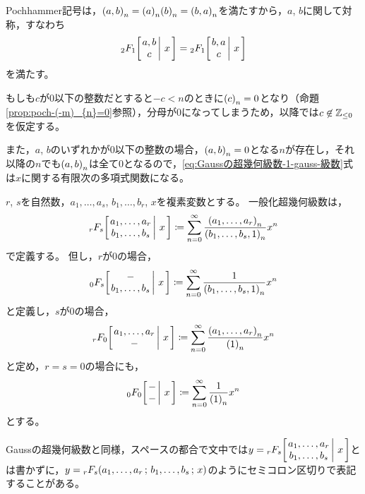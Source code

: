 \documentclass[a4paper,draft]{ltjsarticle}
\begin{document}
\begin{rem}\label{rem:gauss-対称性}
    Pochhammer記号は，$\poch{a,b}{n}=\poch{a}{n}\poch{b}{n}=\poch{b,a}{n}$を満たすから，$a$, $b$に関して対称，すなわち
    \begin{equation}
        \Gauss{a}{b}{c}{x}=\Gauss{b}{a}{c}{x}
    \end{equation}
    を満たす。
\end{rem}

もしも$c$が$0$以下の整数だとすると$-c < n$のときに$\poch{c}{n}=0$となり（命題\ref{prop:poch-(-m)_{n}=0}参照），分母が$0$になってしまうため，以降では$c\not\in\mathbb{Z}_{\leq 0}$を仮定する。

また，$a$, $b$のいずれかが$0$以下の整数の場合，$\poch{a,b}{n}=0$となる$n$が存在し，それ以降の$n$でも$\poch{a,b}{n}$は全て$0$となるので，\eqref{eq:Gaussの超幾何級数-1-gauss-級数}式は$x$に関する有限次の多項式関数になる。

\begin{defi}[一般化超幾何級数]
    $r$, $s$を自然数，$a_1,\dots,a_s$, $b_1,\dots,b_r$, $x$を複素変数とする。
    一般化超幾何級数は，
    \begin{equation}
        \pfq{r}{s}{a_1,\dots,a_r}{b_1,\dots,b_s}{x}\coloneqq \sum_{n=0}^\infty \dfrac{\poch{a_1,\dots,a_r}{n}}{\poch{b_1,\dots,b_s,1}{n}}x^n
    \end{equation}
    で定義する。
    但し，$r$が$0$の場合，
    \begin{equation}
        \pfq{0}{s}{-}{b_1,\dots,b_s}{x}\coloneqq\sum_{n=0}^\infty \dfrac{1}{\poch{b_1,\dots,b_s,1}{n}}x^n
    \end{equation}
    と定義し，$s$が$0$の場合，
    \begin{equation}
        \pfq{r}{0}{a_1,\dots,a_r}{-}{x}\coloneqq \sum_{n=0}^\infty \dfrac{\poch{a_1,\dots,a_r}{n}}{\poch{1}{n}}x^n
    \end{equation}
    と定め，$r=s=0$の場合にも，
    \begin{equation}
        \pfq{0}{0}{-}{-}{x}\coloneqq \sum_{n=0}^\infty \dfrac{1}{\poch{1}{n}}x^n
    \end{equation}
    とする。
\end{defi}

\begin{rem}
    Gaussの超幾何級数と同様，スペースの都合で文中では$y=\pfq{r}{s}{a_1,\dots,a_r}{b_1,\dots,b_s}{x}$とは書かずに，$y=\spfq{r}{s}{a_1,\dots,a_r}{b_1,\dots,b_s}{x}$のようにセミコロン区切りで表記することがある。
\end{rem}
\end{document}
